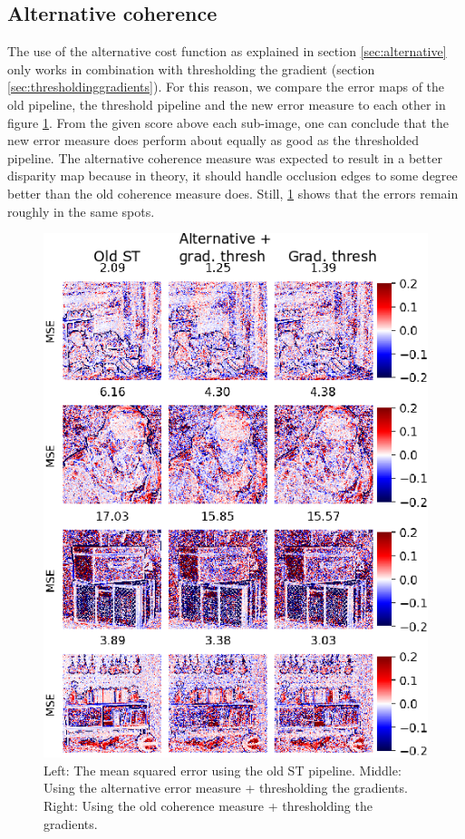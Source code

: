 \documentclass  [
  paper    = a4,
  BCOR     = 10mm,
  twoside,
  fontsize = 12pt,
  fleqn,
  toc      = bibnumbered,
  toc      = listofnumbered,
  numbers  = noendperiod,
  headings = normal,
  listof   = leveldown,
  version  = 3.03
]                                       {scrreprt}
\begin{document}
\subsection{Alternative coherence}
The use of the alternative cost function as explained in section \ref{sec:alternative} only works in combination with thresholding the gradient (section \ref{sec:thresholdinggradients}). For this reason, we compare the error maps of the old pipeline, the threshold pipeline and the new error measure to each other in figure \ref{fig:threshvsoldvsnewerror}. From the given score above each sub-image, one can conclude that the new error measure does perform about equally as good as the thresholded pipeline. The alternative coherence measure was expected to result in a better disparity map because in theory, it should handle occlusion edges to some degree better than the old coherence measure does. Still, \ref{fig:threshvsoldvsnewerror} shows that the errors remain roughly in the same spots.
\begin{figure}[h!]
	\centering
	\includegraphics[width=0.7\linewidth]{images/thresh_vs_old_vs_newerror}
	\caption[Comparing alternative coherence to new coherence]{Left: The mean squared error using the old ST pipeline. Middle: Using the alternative error measure + thresholding the gradients. Right: Using the old coherence measure + thresholding the gradients.}
	\label{fig:threshvsoldvsnewerror}
\end{figure}
\end{document}
